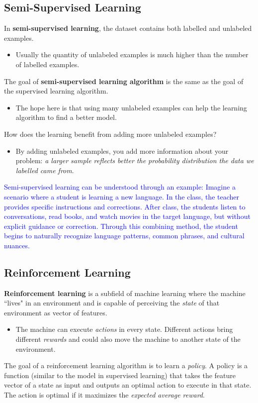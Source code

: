 \subsection{Semi-Supervised Learning}
In \textbf{semi-supervised learning}, the dataset contains both labelled and unlabeled examples.
\begin{itemize}
	\item Usually the quantity of unlabeled examples is much higher than the number of labelled examples.
\end{itemize}
The goal of \textbf{semi-supervised learning algorithm} is the same as the goal of the supervised learning algorithm.
\begin{itemize}
	\item The hope here is that using many unlabeled examples can help the learning algorithm to find a better model.
\end{itemize}
How does the learning benefit from adding more unlabeled examples?
\begin{itemize}
	\item By adding unlabeled examples, you add more information about your problem:\textit{ a larger sample reflects better the probability distribution the data we labelled came from}.
\end{itemize}

\textcolor{blue}{Semi-supervised learning can be understood through an example: Imagine a scenario where a student is learning a new language. In the class, the teacher provides specific instructions and corrections. After class, the students listen to conversations, read books, and watch movies in the target language, but without explicit guidance or correction. Through this combining method, the student begins to naturally recognize language patterns, common phrases, and cultural nuances.
}

\subsection{Reinforcement Learning}
\textbf{Reinforcement learning} is a subfield of machine learning where the machine ``lives" in an environment and is capable of perceiving the \textit{state} of that environment as vector of features.
\begin{itemize}
	\item The machine can execute \textit{actions} in every state. Different actions bring different \textit{rewards} and could also move the machine to another state of the environment.
\end{itemize}
The goal of a reinforcement learning algorithm is to learn a \textit{policy}. A policy is a function (similar to the model in supervised learning) that takes the feature vector of a state as input and outputs an optimal action to execute in that state. The action is optimal if it maximizes the \textit{expected average reward}.

